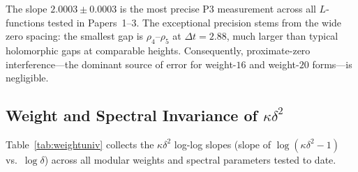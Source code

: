 \documentclass[11pt, a4paper]{article}
\theoremstyle{plain}
\theoremstyle{definition}
\begin{document}
The slope $2.0003\pm 0.0003$ is the most precise P3 measurement across
all $L$-functions tested in Papers~1--3.  The exceptional precision stems
from the wide zero spacing: the smallest gap is $\rho_4$--$\rho_5$ at
$\Delta t=2.88$, much larger than typical holomorphic gaps at comparable
heights.  Consequently, proximate-zero interference---the dominant source
of error for weight-$16$ and weight-$20$ forms---is negligible.

\subsection{Weight and Spectral Invariance of $\kappa\delta^{2}$}
\label{ssec:weightinv}

Table~\ref{tab:weightuniv} collects the $\kappa\delta^{2}$ log-log slopes
(slope of $\log(\kappa\delta^{2}-1)$ vs.\ $\log\delta$) across all modular
weights and spectral parameters tested to date.
\end{document}
